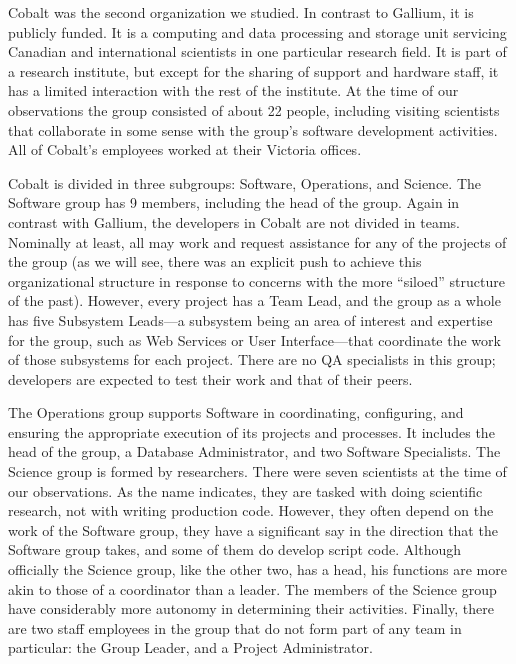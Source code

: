 \documentclass[10pt, conference, compsocconf]{IEEEtran}
\begin{document}
Cobalt was the second organization we studied. In contrast to Gallium, it is publicly funded. It is a computing and data processing and storage unit servicing Canadian and international scientists in one particular research field. It is part of a research institute, but except for the sharing of support and hardware staff, it has a limited interaction with the rest of the institute. At the time of our observations the group consisted of about 22 people, including visiting scientists that collaborate in some sense with the group's software development activities. All of Cobalt's employees worked at their Victoria offices.

Cobalt is divided in three subgroups: Software, Operations, and Science. The Software group has 9 members, including the head of the group. Again in contrast with Gallium, the developers in Cobalt are not divided in teams. Nominally at least, all may work and request assistance for any of the projects of the group (as we will see, there was an explicit push to achieve this organizational structure in response to concerns with the more ``siloed'' structure of the past). However, every project has a Team Lead, and the group as a whole has five Subsystem Leads---a subsystem being an area of interest and expertise for the group, such as Web Services or User Interface---that coordinate the work of those subsystems for each project. There are no QA specialists in this group; developers are expected to test their work and that of their peers.

The Operations group supports Software in coordinating, configuring, and ensuring the appropriate execution of its projects and processes. It includes the head of the group, a Database Administrator, and two Software Specialists. The Science group is formed by researchers. There were seven scientists at the time of our observations. As the name indicates, they are tasked with doing scientific research, not with writing production code. However, they often depend on the work of the Software group, they have a significant say in the direction that the Software group takes, and some of them do develop script code. Although officially the Science group, like the other two, has a head, his functions are more akin to those of a coordinator than a leader. The members of the Science group have considerably more autonomy in determining their activities. Finally, there are two staff employees in the group that do not form part of any team in particular: the Group Leader, and a Project Administrator.
\end{document}
